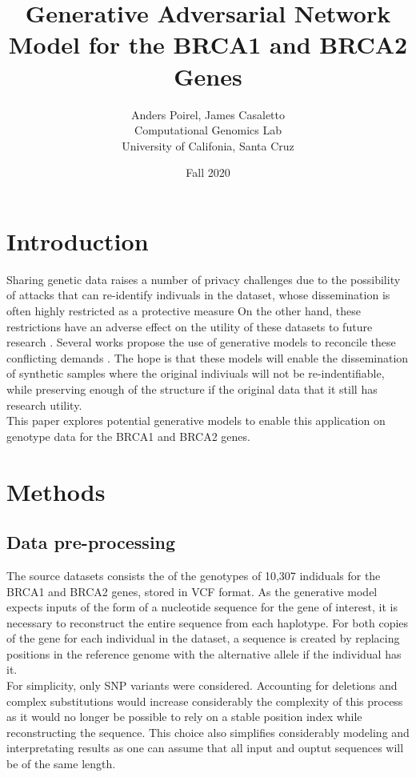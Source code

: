 \documentclass[11pt]{article}
\title{Generative Adversarial Network Model for the BRCA1 and BRCA2 Genes}
\author{
    Anders Poirel, James Casaletto \\ 
    Computational Genomics Lab \\
    University of Califonia, Santa Cruz
}
\date{Fall 2020}
\begin{document}
\maketitle

\section{Introduction}

Sharing genetic data raises a number of privacy challenges due to the possibility 
of attacks that can re-identify indivuals in the dataset,
whose dissemination is often highly restricted as a protective measure \cite{erlich2014routes, aziz2019privacy} 
On the other hand, these restrictions have an adverse effect on the utility of 
these datasets to future research \cite{erlich2014routes, aziz2019privacy}.
Several works propose the use of generative models to reconcile these conflicting
demands \cite{chen2018differentially, yelmen2019creating}. The hope is that these 
models will enable the dissemination of synthetic samples where the original 
indiviuals will not be re-indentifiable, while preserving enough of the structure
if the original data that it still has research utility. \\

This paper explores potential generative models to enable this application on genotype 
data for the BRCA1 and BRCA2 genes. 

\section{Methods}

\subsection{Data pre-processing}

The source datasets consists the of the genotypes of 10,307 indiduals for the BRCA1 and
BRCA2 genes, stored in VCF format. As the generative model expects inputs of the form 
of a nucleotide sequence for the gene of interest, it is necessary to reconstruct the 
entire sequence from each haplotype. For both copies of the gene for each individual in
 the dataset, a sequence is created by replacing positions in the reference genome with
  the alternative allele if the individual has it. \\

For simplicity, only SNP variants were considered. Accounting for deletions and complex 
substitutions would increase considerably the complexity of this process as it would no 
longer be possible to rely on a stable position index while reconstructing the 
sequence. This choice also simplifies considerably modeling and interpretating results
 as one can assume that all input and ouptut sequences will be of the same length.
\end{document}
